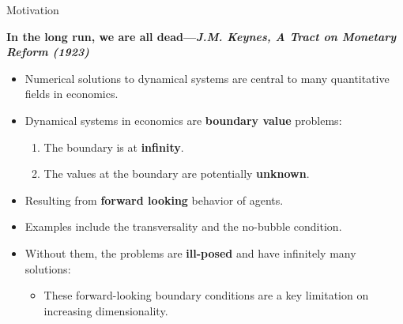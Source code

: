 \documentclass[aspectratio=169,10pt]{beamer}
\newcommand{\emphcolor}[1]{\textbf{\textcolor{emphcolorval}{#1}}}
\begin{document}
\begin{frame}{Motivation}
	\begin{center}
		\emphcolor{In the long run, we are all dead---{\it J.M. Keynes, A Tract on Monetary Reform (1923)}}
	\end{center}
	\begin{itemize}
		\item Numerical solutions to dynamical systems are central to many quantitative fields in economics.
		\vspace{0.1in}
		\item Dynamical systems in economics are \emphcolor{boundary value} problems:
		\vspace{0.1in}
		\begin{enumerate}
				\item The boundary is at \emphcolor{infinity}.
				\vspace{0.05in}
				\item The values at the boundary are potentially \emphcolor{unknown}.
				\vspace{0.05in}  
		\end{enumerate}
		\item Resulting from \emphcolor{forward looking} behavior of agents.
		\vspace{0.1in}
		\item Examples include the transversality and the no-bubble condition.
		\vspace{0.1in}
		\item Without them, the problems are \emphcolor{ill-posed}  and have infinitely many solutions: 
		\vspace{0.1in}
		\begin{itemize}
			\item These forward-looking boundary conditions are a key limitation on increasing dimensionality.
		\end{itemize}
	\end{itemize}
\end{frame}
\end{document}
